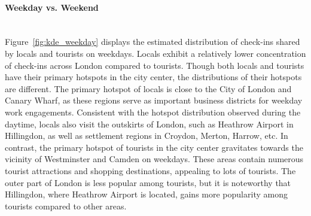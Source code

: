 \documentclass{article}
\newcommand{\subsubsubsection}[1]{\paragraph{#1}\mbox{}\\}
\theoremstyle{remark}
\begin{document}
\subsubsubsection{Weekday vs. Weekend}
Figure~\ref{fig:kde_weekday} displays the estimated distribution of check-ins shared by locals and tourists on weekdays. Locals exhibit a relatively lower concentration of check-ins across London compared to tourists. Though both locals and tourists have their primary hotspots in the city center, the distributions of their hotspots are different. The primary hotspot of locals is close to the City of London and Canary Wharf, as these regions serve as important business districts for weekday work engagements. Consistent with the hotspot distribution observed during the daytime, locals also visit the outskirts of London, such as Heathrow Airport in Hillingdon, as well as settlement regions in Croydon, Merton, Harrow, etc. In contrast, the primary hotspot of tourists in the city center gravitates towards the vicinity of Westminster and Camden on weekdays. These areas contain numerous tourist attractions and shopping destinations, appealing to lots of tourists. The outer part of London is less popular among tourists, but it is noteworthy that Hillingdon, where Heathrow Airport is located, gains more popularity among tourists compared to other areas.
\end{document}
